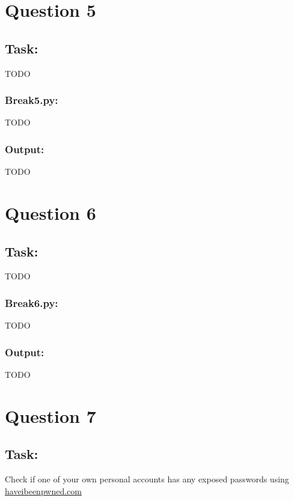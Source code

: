 \documentclass{article}
\begin{document}
\section{Question 5}
\subsection*{Task:}
TODO
\subsubsection*{Break5.py:}
TODO
\subsubsection*{Output:}
TODO
\section{Question 6}
\subsection*{Task:}
TODO
\subsubsection*{Break6.py:}
TODO
\subsubsection*{Output:}
TODO
\section{Question 7}
\subsection*{Task:}
Check if one of your own personal accounts has any exposed passwords using 
\href{https://haveibeenpwned.com/}{haveibeenpwned.com}
\end{document}
